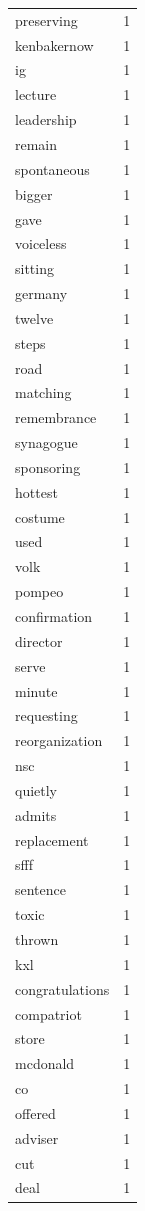 \begin{tabular}{lr}
preserving & 1 \\
kenbakernow & 1 \\
ig & 1 \\
lecture & 1 \\
leadership & 1 \\
remain & 1 \\
spontaneous & 1 \\
bigger & 1 \\
gave & 1 \\
voiceless & 1 \\
sitting & 1 \\
germany & 1 \\
twelve & 1 \\
steps & 1 \\
road & 1 \\
matching & 1 \\
remembrance & 1 \\
synagogue & 1 \\
sponsoring & 1 \\
hottest & 1 \\
costume & 1 \\
used & 1 \\
volk & 1 \\
pompeo & 1 \\
confirmation & 1 \\
director & 1 \\
serve & 1 \\
minute & 1 \\
requesting & 1 \\
reorganization & 1 \\
nsc & 1 \\
quietly & 1 \\
admits & 1 \\
replacement & 1 \\
sfff & 1 \\
sentence & 1 \\
toxic & 1 \\
thrown & 1 \\
kxl & 1 \\
congratulations & 1 \\
compatriot & 1 \\
store & 1 \\
mcdonald & 1 \\
co & 1 \\
offered & 1 \\
adviser & 1 \\
cut & 1 \\
deal & 1 \\

\end{tabular}
